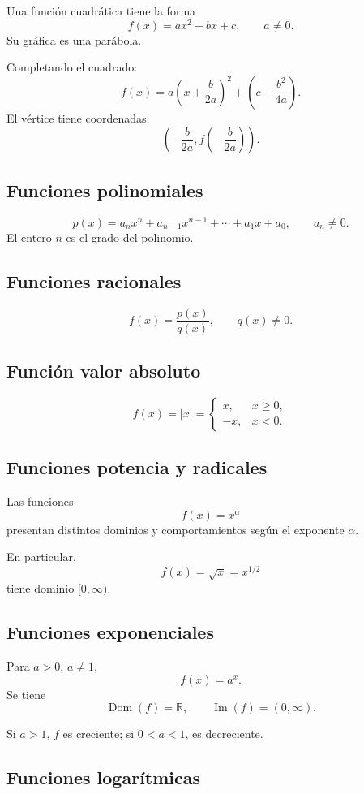 \documentclass[12pt]{article}
\theoremstyle{remark}
\newcommand{\R}{\mathbb{R}}
\newcommand{\Dom}{\operatorname{Dom}}
\newcommand{\Ima}{\operatorname{Im}}
\begin{document}
Una función cuadrática tiene la forma
\[
f(x)=ax^2+bx+c,\qquad a\neq0.
\]
Su gráfica es una parábola.

Completando el cuadrado:
\[
f(x)
=a\left(x+\frac{b}{2a}\right)^2
+\left(c-\frac{b^2}{4a}\right).
\]
El vértice tiene coordenadas
\[
\left(
-\frac{b}{2a},
f\left(-\frac{b}{2a}\right)
\right).
\]

\subsection{Funciones polinomiales}

\[
p(x)=a_nx^n+a_{n-1}x^{n-1}+\cdots+a_1x+a_0,
\qquad a_n\neq0.
\]
El entero $n$ es el grado del polinomio.

\subsection{Funciones racionales}

\[
f(x)=\frac{p(x)}{q(x)},\qquad q(x)\neq0.
\]

\subsection{Función valor absoluto}

\[
f(x)=|x|=
\begin{cases}
x,&x\geq0,\\
-x,&x<0.
\end{cases}
\]

\subsection{Funciones potencia y radicales}

Las funciones
\[
f(x)=x^\alpha
\]
presentan distintos dominios y comportamientos según el exponente $\alpha$.

En particular,
\[
f(x)=\sqrt{x}=x^{1/2}
\]
tiene dominio $[0,\infty)$.

\subsection{Funciones exponenciales}

Para $a>0$, $a\neq1$,
\[
f(x)=a^x.
\]
Se tiene
\[
\Dom(f)=\R,\qquad \Ima(f)=(0,\infty).
\]

Si $a>1$, $f$ es creciente; si $0<a<1$, es decreciente.

\subsection{Funciones logarítmicas}
\end{document}
